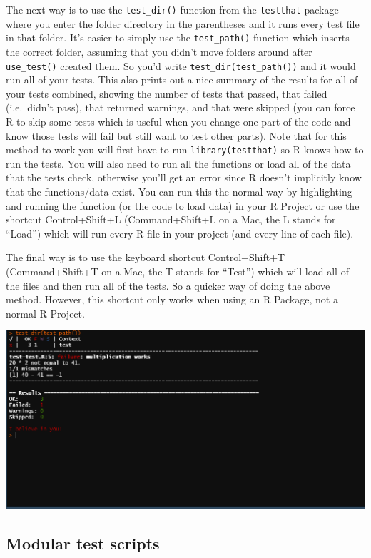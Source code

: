 \documentclass[
]{krantz}
\begin{document}
The next way is to use the \texttt{test\_dir()} function from the \texttt{testthat} package where you enter the folder directory in the parentheses and it runs every test file in that folder. It's easier to simply use the \texttt{test\_path()} function which inserts the correct folder, assuming that you didn't move folders around after \texttt{use\_test()} created them. So you'd write \texttt{test\_dir(test\_path())} and it would run all of your tests. This also prints out a nice summary of the results for all of your tests combined, showing the number of tests that passed, that failed (i.e.~didn't pass), that returned warnings, and that were skipped (you can force R to skip some tests which is useful when you change one part of the code and know those tests will fail but still want to test other parts). Note that for this method to work you will first have to run \texttt{library(testthat)} so R knows how to run the tests. You will also need to run all the functions or load all of the data that the tests check, otherwise you'll get an error since R doesn't implicitly know that the functions/data exist. You can run this the normal way by highlighting and running the function (or the code to load data) in your R Project or use the shortcut Control+Shift+L (Command+Shift+L on a Mac, the L stands for ``Load'') which will run every R file in your project (and every line of each file).

The final way is to use the keyboard shortcut Control+Shift+T (Command+Shift+T on a Mac, the T stands for ``Test'') which will load all of the files and then run all of the tests. So a quicker way of doing the above method. However, this shortcut only works when using an R Package, not a normal R Project.

\includegraphics{images/test_summary.PNG}

\hypertarget{modular-test-scripts}{%
\subsection{Modular test scripts}\label{modular-test-scripts}}
\end{document}
